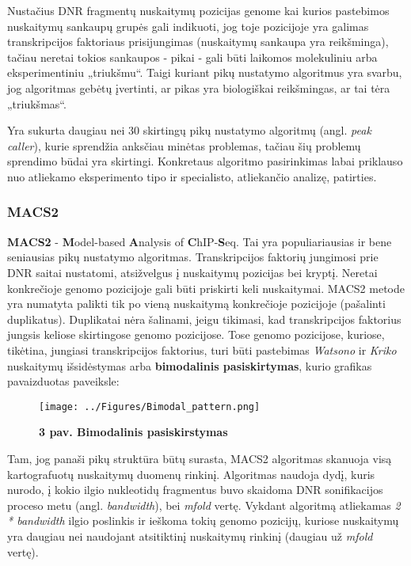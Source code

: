 \documentclass[12pt]{article}
\begin{document}
Nustačius DNR fragmentų nuskaitymų pozicijas genome kai kurios pastebimos
nuskaitymų sankaupų grupės gali indikuoti, jog toje pozicijoje yra galimas
transkripcijos faktoriaus prisijungimas (nuskaitymų sankaupa yra reikšminga),
tačiau neretai tokios sankaupos - pikai - gali būti laikomos molekuliniu arba
eksperimentiniu „triukšmu“. Taigi kuriant pikų nustatymo algoritmus yra
svarbu, jog algoritmas gebėtų įvertinti, ar pikas yra biologiškai reikšmingas,
ar tai tėra „triukšmas“.

Yra sukurta daugiau nei 30 skirtingų pikų nustatymo algoritmų (angl.
\emph{peak caller}), kurie sprendžia anksčiau minėtas problemas,
tačiau šių problemų sprendimo būdai yra skirtingi. Konkretaus algoritmo
pasirinkimas labai priklauso nuo atliekamo eksperimento tipo ir specialisto,
atliekančio analizę, patirties\cite{ARTICLE13}.

\subsubsection{MACS2}
\textbf{MACS2} - \textbf{M}odel-based \textbf{A}nalysis of
\textbf{C}hIP-\textbf{S}eq. Tai yra populiariausias ir bene seniausias
pikų nustatymo algoritmas.
Transkripcijos faktorių jungimosi prie DNR saitai nustatomi, atsižvelgus į
nuskaitymų pozicijas bei kryptį. Neretai konkrečioje genomo pozicijoje gali
būti priskirti keli nuskaitymai. MACS2 metode yra numatyta palikti tik po
vieną nuskaitymą konkrečioje pozicijoje (pašalinti duplikatus). Duplikatai
nėra šalinami, jeigu tikimasi, kad transkripcijos faktorius jungsis keliose
skirtingose genomo pozicijose. Tose genomo pozicijose, kuriose, tikėtina,
jungiasi transkripcijos faktorius, turi būti pastebimas \emph{Watsono} ir
\emph{Kriko} nuskaitymų išsidėstymas arba \textbf{bimodalinis pasiskirtymas},
kurio grafikas pavaizduotas paveiksle:

\begin{figure}[ht]
    \begin{center}
        \texttt{[image: ../Figures/Bimodal\_pattern.png]}
        \vspace{-1\baselineskip}
        \caption*{\small\textbf{3 pav. Bimodalinis pasiskirstymas}}
    \end{center}
\end{figure}

Tam, jog panaši pikų struktūra būtų surasta, MACS2 algoritmas skanuoja visą
kartografuotų nuskaitymų duomenų rinkinį. Algoritmas naudoja dydį, kuris nurodo,
į kokio ilgio nukleotidų fragmentus buvo skaidoma DNR sonifikacijos proceso
metu (angl. \emph{bandwidth}), bei \emph{mfold} vertę. Vykdant algoritmą
atliekamas \emph{2 * bandwidth} ilgio poslinkis ir ieškoma tokių genomo
pozicijų, kuriose nuskaitymų yra daugiau nei naudojant atsitiktinį nuskaitymų
rinkinį (daugiau už \emph{mfold} vertę).
\end{document}
